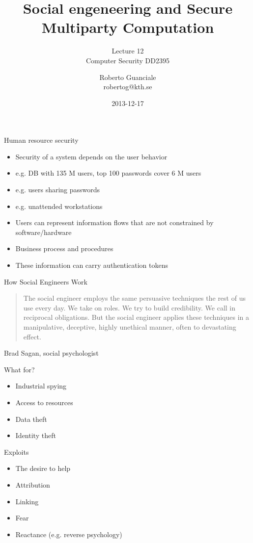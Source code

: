 \documentclass{beamer}
\title{Social engeneering and Secure Multiparty Computation}
\subtitle{Lecture 12 \\ Computer Security DD2395}
\author[R. Guanciale]{
  Roberto Guanciale\\
  robertog@kth.se
}
\date{2013-12-17}
\begin{document}
\begin{frame}[plain]
  \titlepage
\end{frame}

\begin{frame}{Human resource security}
  \begin{itemize}
    \item Security of a system depends on the user behavior
    \item e.g. DB with 135 M users, top 100 passwords cover 6 M users
    \item e.g. users sharing passwords
    \item e.g. unattended workstations
    \item Users can represent information flows that are not
      constrained by software/hardware
    \item Business process and procedures
    \item These information can carry authentication tokens
  \end{itemize}
\end{frame}


\begin{frame}{How Social Engineers Work}
  
  \begin{quote}
The social engineer employs the same persuasive 
techniques the rest of us use every day. We take 
on roles. We try to build credibility. We call in 
reciprocal obligations. But the social engineer 
applies these techniques in a manipulative, 
deceptive, highly unethical manner, often to 
devastating effect.
  \end{quote}
Brad Sagan, social psychologist
\end{frame}

\begin{frame}{What for?}
  \begin{itemize}
    \item Industrial spying 
    \item Access to resources 
    \item Data theft
    \item Identity theft
  \end{itemize}
\end{frame}
 

\begin{frame}{Exploits}
  \begin{itemize}
    \item The desire to help 
    \item Attribution
    \item Linking
    \item Fear
    \item Reactance (e.g. reverse psychology)
  \end{itemize}
\end{frame}
\end{document}
